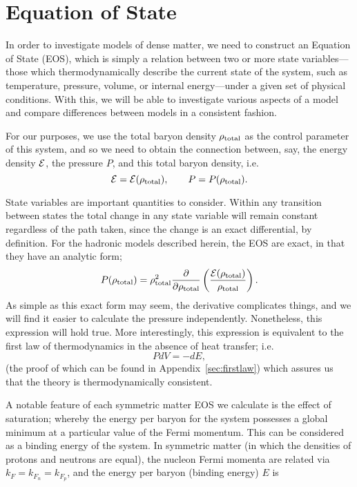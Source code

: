 \documentclass[11pt,a4paper,twoside]{carrollthesis}
\newcommand{\be}{\begin{equation}}
\newcommand{\ee}{\end{equation}}
\newcommand{\del}{\partial}
\newcommand{\emdash}{\hspace{1pt}---\hspace{1pt}}
\begin{document}
\section{Equation of State}\label{sec:EoS}
%
In order to investigate models of dense matter, we need to construct
an Equation of State (EOS), which is simply a relation between two or
more state variables\emdash those which thermodynamically describe the
current state of the system, such as temperature, pressure, volume, or
internal energy\emdash under a given set of physical conditions. With
this, we will be able to investigate various aspects of a model and
compare differences between models in a consistent fashion.\par
%
For our purposes, we use the total baryon density $\rho_{\rm total}$
as the control parameter of this system, and so we need to obtain the
connection between, say, the energy density ${\cal E}$, the pressure
$P$, and this total baryon density, i.e.
%
\be {\cal E} = {\cal E}(\rho_{\rm total}), \qquad P = P(\rho_{\rm
  total}).  \ee
%
\par
%
State variables are important quantities to consider. Within any
transition between states the total change in any state variable will
remain constant regardless of the path taken, since the change is an
exact differential, by definition. For the hadronic models described
herein, the EOS are exact, in that they have an analytic form;
%
\be \label{eq:Panalytic} P(\rho_{\rm total}) = \rho_{\rm
  total}^2\frac{\del}{\del\rho_{\rm total}}\left(\frac{{\cal
    E}(\rho_{\rm total})}{\rho_{\rm total}}\right).  \ee
%
As simple as this exact form may seem, the derivative complicates
things, and we will find it easier to calculate the pressure
independently. Nonetheless, this expression will hold true. More
interestingly, this expression is equivalent to the first law of
thermodynamics in the absence of heat transfer; i.e.
%
\be PdV = - dE, \ee
%
(the proof of which can be found in Appendix~\ref{sec:firstlaw}) which
assures us that the theory is thermodynamically consistent.\par
%
A notable feature of each symmetric matter EOS we calculate is the
effect of saturation; whereby the energy per baryon for the system
possesses a global minimum at a particular value of the Fermi
momentum. This can be considered as a binding energy of the system. In
symmetric matter (in which the densities of protons and neutrons are
equal), the nucleon Fermi momenta are related via \mbox{$k_F = k_{F_n}
  = k_{F_p}$}, and the energy per baryon (binding energy) $E$ is
\end{document}
